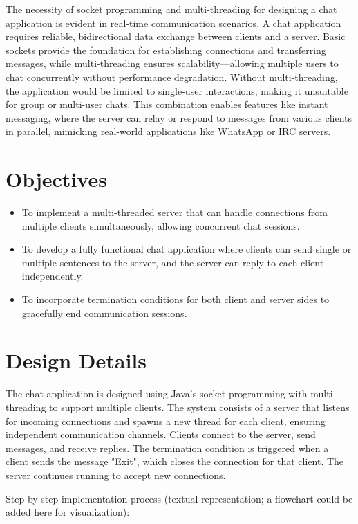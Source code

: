 \documentclass{article}
\begin{document}
The necessity of socket programming and multi-threading for designing a chat application is evident in real-time communication scenarios. A chat application requires reliable, bidirectional data exchange between clients and a server. Basic sockets provide the foundation for establishing connections and transferring messages, while multi-threading ensures scalability—allowing multiple users to chat concurrently without performance degradation. Without multi-threading, the application would be limited to single-user interactions, making it unsuitable for group or multi-user chats. This combination enables features like instant messaging, where the server can relay or respond to messages from various clients in parallel, mimicking real-world applications like WhatsApp or IRC servers.

\section{Objectives}

\begin{itemize}[label=$\bullet$]
    \item To implement a multi-threaded server that can handle connections from multiple clients simultaneously, allowing concurrent chat sessions.
    \item To develop a fully functional chat application where clients can send single or multiple sentences to the server, and the server can reply to each client independently.
    \item To incorporate termination conditions for both client and server sides to gracefully end communication sessions.
\end{itemize}

\section{Design Details}

The chat application is designed using Java's socket programming with multi-threading to support multiple clients. The system consists of a server that listens for incoming connections and spawns a new thread for each client, ensuring independent communication channels. Clients connect to the server, send messages, and receive replies. The termination condition is triggered when a client sends the message "Exit", which closes the connection for that client. The server continues running to accept new connections.

Step-by-step implementation process (textual representation; a flowchart could be added here for visualization):
\end{document}
